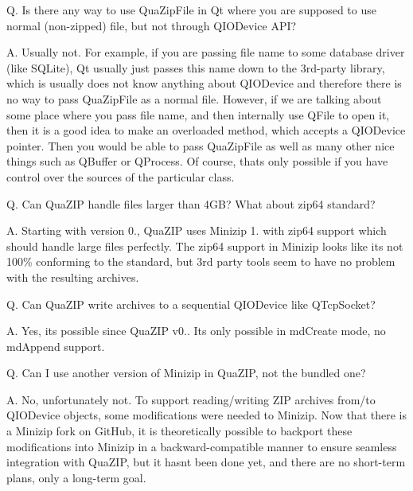 \label{faq_faq-non-QIODevice}%
%
Q. Is there any way to use Qua\+Zip\+File in Qt where you are supposed to use normal (non-\/zipped) file, but not through Q\+I\+O\+Device A\+PI?

A. Usually not. For example, if you are passing file name to some database driver (like S\+Q\+Lite), Qt usually just passes this name down to the 3rd-\/party library, which is usually does not know anything about Q\+I\+O\+Device and therefore there is no way to pass Qua\+Zip\+File as a normal file. However, if we are talking about some place where you pass file name, and then internally use Q\+File to open it, then it is a good idea to make an overloaded method, which accepts a Q\+I\+O\+Device pointer. Then you would be able to pass Qua\+Zip\+File as well as many other nice things such as Q\+Buffer or Q\+Process. Of course, that\textquotesingle{}s only possible if you have control over the sources of the particular class.

\label{faq_faq-zip64}%
%
Q. Can Qua\+Z\+IP handle files larger than 4GB? What about zip64 standard?

A. Starting with version 0., Qua\+Z\+IP uses Minizip 1. with zip64 support which should handle large files perfectly. The zip64 support in Minizip looks like it\textquotesingle{}s not 100\% conforming to the standard, but 3rd party tools seem to have no problem with the resulting archives.

\label{faq_faq-seekable}%
%
Q. Can Qua\+Z\+IP write archives to a sequential Q\+I\+O\+Device like Q\+Tcp\+Socket?

A. Yes, it\textquotesingle{}s possible since Qua\+Z\+IP v0.. It\textquotesingle{}s only possible in md\+Create mode, no md\+Append support.

\label{faq_faq-Minizip-update}%
%
Q. Can I use another version of Minizip in Qua\+Z\+IP, not the bundled one?

A. No, unfortunately not. To support reading/writing Z\+IP archives from/to Q\+I\+O\+Device objects, some modifications were needed to Minizip. Now that there is a Minizip fork on Git\+Hub, it is theoretically possible to backport these modifications into Minizip in a backward-\/compatible manner to ensure seamless integration with Qua\+Z\+IP, but it hasn\textquotesingle{}t been done yet, and there are no short-\/term plans, only a long-\/term goal. 